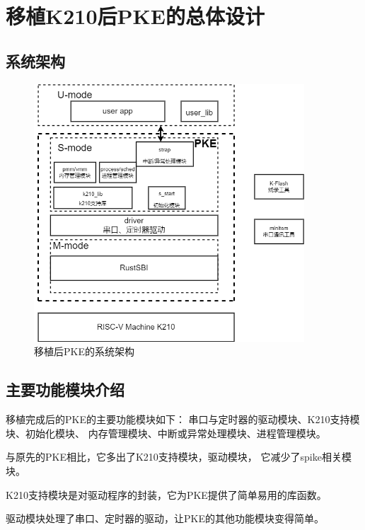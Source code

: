\section{移植K210后PKE的总体设计}

\subsection{系统架构}

\begin{figure}[h]
    \vspace{13pt} %
    \centering
    \includegraphics[width=0.9\textwidth]{images/after_sys_struct.drawio.png}
    \caption{移植后PKE的系统架构}\label{移植后PKE的系统架构} %
\end{figure}

\subsection{主要功能模块介绍}

移植完成后的PKE的主要功能模块如下：
串口与定时器的驱动模块、K210支持模块、初始化模块、
内存管理模块、中断或异常处理模块、进程管理模块。

与原先的PKE相比，它多出了K210支持模块，驱动模块，
它减少了spike相关模块。

K210支持模块是对驱动程序的封装，它为PKE提供了简单易用的库函数。

驱动模块处理了串口、定时器的驱动，让PKE的其他功能模块变得简单。

